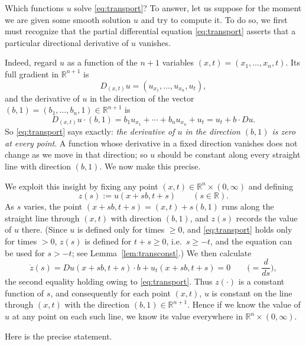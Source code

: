 \documentclass[11pt]{article}
\theoremstyle{plain}
\theoremstyle{definition}
\theoremstyle{remark}
\begin{document}
Which functions $u$ solve \eqref{eq:transport}? To answer, let us suppose for the moment we are given some smooth solution $u$ and try to compute it. To do so, we first must recognize that the partial differential equation \eqref{eq:transport} asserts that a particular directional derivative of $u$ vanishes.

Indeed, regard $u$ as a function of the $n+1$ variables $(x,t) = (x_1,\dots,x_n,t)$. Its full gradient in $\mathbb{R}^{n+1}$ is
$$ D_{(x,t)}u = (u_{x_1},\dots,u_{x_n},u_t), $$
and the derivative of $u$ in the direction of the vector $(b,1) = (b_1,\dots,b_n,1) \in \mathbb{R}^{n+1}$ is
$$ D_{(x,t)}u\cdot(b,1) = b_1u_{x_1} + \cdots + b_nu_{x_n} + u_t = u_t + b\cdot Du. $$
So \eqref{eq:transport} says exactly: \emph{the derivative of $u$ in the direction $(b,1)$ is zero at every point}. A function whose derivative in a fixed direction vanishes does not change as we move in that direction; so $u$ should be constant along every straight line with direction $(b,1)$. We now make this precise.

We exploit this insight by fixing any point $(x,t) \in \mathbb{R}^n \times (0,\infty)$ and defining
$$ z(s) := u(x + sb, t + s) \qquad (s \in \mathbb{R}). $$
As $s$ varies, the point $(x + sb, t + s) = (x,t) + s(b,1)$ runs along the straight line through $(x,t)$ with direction $(b,1)$, and $z(s)$ records the value of $u$ there. (Since $u$ is defined only for times $\ge 0$, and \eqref{eq:transport} holds only for times $> 0$, $z(s)$ is defined for $t + s \geq 0$, i.e.\ $s \geq -t$, and the equation can be used for $s > -t$; see Lemma~\ref{lem:transconst}.) We then calculate
$$ \dot z(s) = Du(x + sb, t + s)\cdot b + u_t(x + sb, t + s) = 0 \qquad \Big(\dot{} = \frac{d}{ds}\Big), $$
the second equality holding owing to \eqref{eq:transport}. Thus $z(\cdot)$ is a constant function of $s$, and consequently for each point $(x,t)$, $u$ is constant on the line through $(x,t)$ with the direction $(b,1) \in \mathbb{R}^{n+1}$. Hence if we know the value of $u$ at any point on each such line, we know its value everywhere in $\mathbb{R}^n \times (0,\infty)$.

Here is the precise statement.
\end{document}
